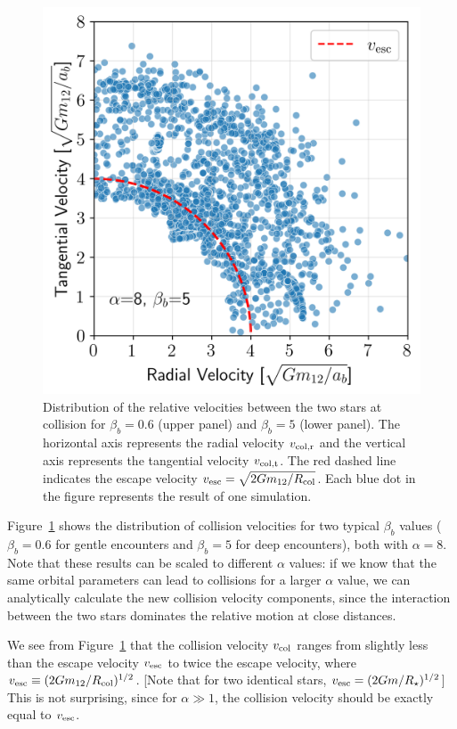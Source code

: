 \documentclass[twocolumn]{aastex631}
\begin{document}
\begin{figure}[htbp]
{\begin{minipage}[b]{0.95\linewidth}
                \includegraphics[width=\columnwidth]{figures/v_largebeta.png}
            \end{minipage}
        }
        \caption{
        Distribution of the relative velocities between the two stars at collision for $\beta_b=0.6$ (upper panel) and $\beta_b=5$ (lower panel). 
        The horizontal axis represents the radial velocity $v_{\rm col,r}$ and the vertical axis represents the tangential velocity $v_{\rm col,t}$.
        The red dashed line indicates the escape velocity $v_{\rm esc}=\sqrt{2Gm_{12}/R_{\rm col}}$.
        Each blue dot in the figure represents the result of one simulation.}
        \label{Fig:collision_v}
\end{figure}

Figure~\ref{Fig:collision_v} shows the distribution of collision velocities for two typical $\beta_b$ values ($\beta_b=0.6$ for gentle encounters and $\beta_b=5$ for deep encounters), both with $\alpha = 8$.
Note that these results can be scaled to different $\alpha$ values: 
if we know that the same orbital parameters can lead to collisions for a larger $\alpha$ value, we can analytically calculate the new collision velocity components, since the interaction between the two stars dominates the relative motion at close distances.

We see from Figure~\ref{Fig:collision_v} that the collision velocity $v_{\rm col}$ ranges from slightly less than the escape velocity $v_{\rm esc}$ to twice the escape velocity, where $v_{\rm esc} \equiv (2Gm_{12}/R_{\rm col})^{1/2}$. [Note that for two identical stars, $v_{\rm esc} = (2Gm/R_{\star})^{1/2}$]
This is not surprising, since for $\alpha \gg 1$, the collision velocity should be exactly equal to $v_{\rm esc}$.
\end{document}

